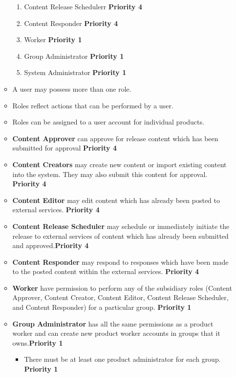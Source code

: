 \documentclass{report}
\begin{document}
\begin{itemize}
\begin{itemize}
\begin{enumerate}
							\item Content Release Schedulerr \textbf{Priority 4}  
							\item Content Responder \textbf{Priority 4}
						   	\item Worker \textbf{Priority 1}	
							\item Group Administrator \textbf{Priority 1}   
							\item System Administrator \textbf{Priority 1}  
						\end{enumerate}
					\item A user may possess more than one role.
					\item Roles reflect actions that can be performed by a user.
					\item Roles can be assigned to a user account for individual products.
					\item \textbf{Content Approver} can approve for release content which has been
					submitted for approval \textbf{Priority 4}
					\item \textbf{Content Creators} may create new content or 
					import existing content into the system. They may also 
					submit this content for approval. \textbf{Priority 4}
					\item \textbf{Content Editor} may edit content which has already been posted to external
					services. \textbf{Priority 4} 
					\item \textbf{Content Release Scheduler} may schedule or 
					immediately initiate the release to external services of 
					content which has already been submitted and 
					approved.\textbf{Priority 4}  
					\item \textbf{Content Responder} may respond to responses 
					which have been made to the posted content within the 
					external services.  \textbf{Priority 4} 
					
					\item \textbf{Worker} have permission to perform any 
					of the subsidiary roles (Content Approver, Content Creator, 
						Content Editor, Content Release Scheduler, and Content 
						Responder) for a particular group.  \textbf{Priority 1}
					
					\item \textbf{Group Administrator} has all the same 
					permissions as a product worker and can create new product
					worker accounts in groups that it owns.\textbf{Priority 1}  
					
					\begin{itemize}
						\item There must be at least one product administrator 
						for each group. \textbf{Priority 1}
					\end{itemize}


\end{itemize}
\end{itemize}
\end{document}
